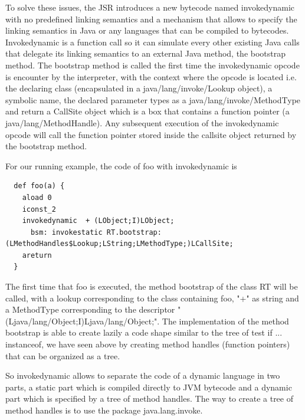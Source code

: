 \documentclass{sigplanconf}
\def \Jsr{JSR\xspace}
\begin{document}
      To solve these issues, the \Jsr introduces a new bytecode named invokedynamic with no predefined
      linking semantics and a mechanism that allows to specify the linking semantics in Java
      or any languages that can be compiled to bytecodes.
      Invokedynamic is a function call so it can simulate every other existing Java calls that delegate
      its linking semantics to an external Java method, the bootstrap method.
      The bootstrap method is called the first time the invokedynamic opcode is encounter by the interpreter,
      with the context where the opcode is located i.e.
      the declaring class (encapsulated in a java/lang/invoke/Lookup object), a symbolic name,
      the declared parameter types as a java/lang/invoke/MethodType and return
      a CallSite object which is a box that contains a function pointer (a java/lang/MethodHandle).
      Any subsequent execution of the invokedynamic opcode will call the function pointer
      stored inside the callsite object returned by the bootstrap method.
      
      For our running example, the code of foo with invokedynamic is
     {\tiny      
      \begin{verbatim}
  def foo(a) {
    aload 0
    iconst_2 
    invokedynamic  + (LObject;I)LObject;
      bsm: invokestatic RT.bootstrap:(LMethodHandles$Lookup;LString;LMethodType;)LCallSite;
    areturn 
  }
      \end{verbatim}
      }

      The first time that foo is executed, the method bootstrap of the class RT will be called, with a lookup corresponding to the class containing foo,
      "+" as string and a MethodType corresponding to the descriptor "(Ljava/lang/Object;I)Ljava/lang/Object;".
      The implementation of the method bootstrap is able to create lazily a code shape similar to the tree of test if ... instanceof,
      we have seen above by creating method handles (function pointers) that can be organized as a tree. 
      
      So invokedynamic allows to separate the code of a dynamic language in two parts, a static part which is compiled directly to JVM bytecode
      and a dynamic part which is specified by a tree of method handles.
      The way to create a tree of method handles is to use the package java.lang.invoke.      
\end{document}

